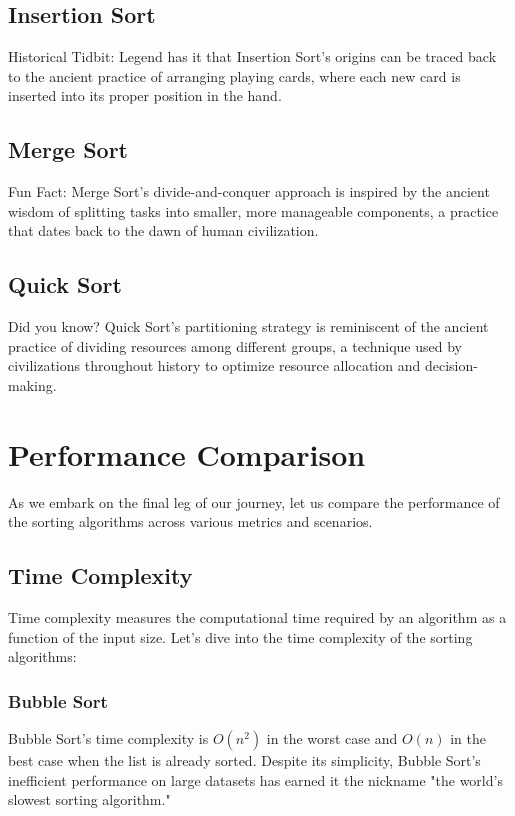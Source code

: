 \documentclass{article}
\begin{document}
\subsection{Insertion Sort}
Historical Tidbit: Legend has it that Insertion Sort's origins can be traced back to the ancient practice of arranging playing cards, where each new card is inserted into its proper position in the hand.

\subsection{Merge Sort}
Fun Fact: Merge Sort's divide-and-conquer approach is inspired by the ancient wisdom of splitting tasks into smaller, more manageable components, a practice that dates back to the dawn of human civilization.

\subsection{Quick Sort}
Did you know? Quick Sort's partitioning strategy is reminiscent of the ancient practice of dividing resources among different groups, a technique used by civilizations throughout history to optimize resource allocation and decision-making.

\section{Performance Comparison}

As we embark on the final leg of our journey, let us compare the performance of the sorting algorithms across various metrics and scenarios.

\subsection{Time Complexity}
Time complexity measures the computational time required by an algorithm as a function of the input size. Let's dive into the time complexity of the sorting algorithms:

\subsubsection{Bubble Sort}
Bubble Sort's time complexity is \(O(n^2)\) in the worst case and \(O(n)\) in the best case when the list is already sorted. Despite its simplicity, Bubble Sort's inefficient performance on large datasets has earned it the nickname "the world's slowest sorting algorithm."
\end{document}
